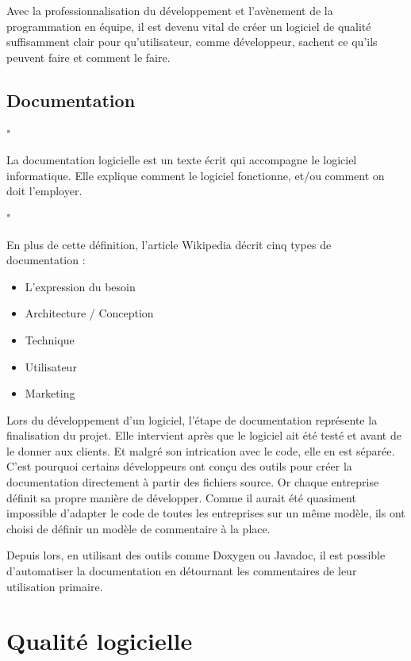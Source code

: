 \documentclass[10pt,a4paper,twoside, openany]{report}
\begin{document}
Avec la professionnalisation du d\'eveloppement et l'av\`enement de la programmation en \'equipe, il est devenu vital de cr\'eer un logiciel de qualit\'e suffisamment clair pour qu'utilisateur, comme d\'eveloppeur, sachent ce qu'ils peuvent faire et comment le faire.

\subsection{Documentation}

\begin{quoting}
\begin{large}"\end{large}
La documentation logicielle est un texte \'ecrit qui accompagne le logiciel informatique. Elle explique comment le logiciel fonctionne, et/ou comment on doit l'employer.
\begin{large}"\end{large}
\end{quoting}

En plus de cette d\'efinition, l'article Wikipedia d\'ecrit cinq types de documentation :
\begin{itemize}
\item{L'expression du besoin}
\item{Architecture / Conception}
\item{Technique}
\item{Utilisateur}
\item{Marketing}
\end{itemize}

Lors du d\'eveloppement d'un logiciel, l'\'etape de documentation repr\'esente la finalisation du projet. Elle intervient apr\`es que le logiciel ait \'et\'e test\'e et avant de le donner aux clients. Et malgr\'e  son intrication avec le code, elle en est s\'epar\'ee. C'est pourquoi certains d\'eveloppeurs ont con\c cu  des outils pour cr\'eer la documentation directement \`a partir des fichiers source. Or chaque entreprise d\'efinit sa propre mani\`ere de d\'evelopper. Comme il aurait \'et\'e quasiment impossible d'adapter le code de toutes les entreprises sur un m\^eme mod\`ele, ils ont choisi de d\'efinir un mod\`ele de commentaire \`a la place.\newline

Depuis lors, en utilisant des outils comme Doxygen ou Javadoc, il est possible d'automatiser la documentation en d\'etournant les commentaires de leur utilisation primaire.

\section{Qualit\'e logicielle}
\end{document}
